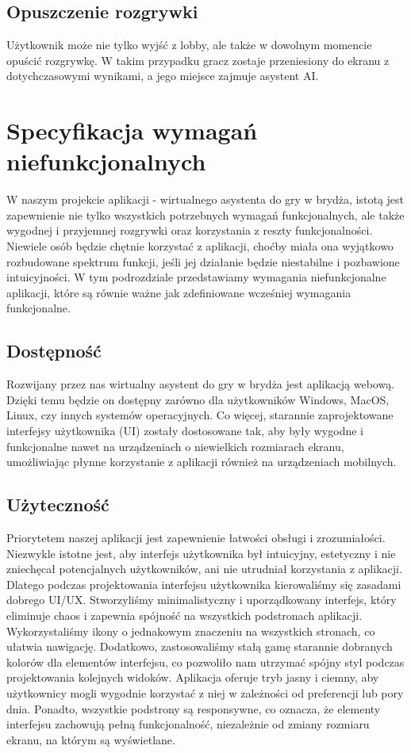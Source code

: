\subsection{Opuszczenie rozgrywki}
Użytkownik może nie tylko wyjść z lobby, ale także w dowolnym momencie opuścić rozgrywkę. W takim przypadku gracz zostaje przeniesiony do ekranu z dotychczasowymi wynikami, a jego miejsce zajmuje asystent AI.

\section{Specyfikacja wymagań niefunkcjonalnych}
W naszym projekcie aplikacji - wirtualnego asystenta do gry w brydża, istotą jest zapewnienie nie tylko wszystkich potrzebnych wymagań funkcjonalnych, ale także wygodnej i przyjemnej rozgrywki oraz korzystania z reszty funkcjonalności. Niewiele osób będzie chętnie korzystać z aplikacji, choćby miała ona wyjątkowo rozbudowane spektrum funkcji, jeśli jej działanie będzie niestabilne i pozbawione intuicyjności. W tym podrozdziale przedstawiamy wymagania niefunkcjonalne aplikacji, które są równie ważne jak zdefiniowane wcześniej wymagania funkcjonalne.
\subsection{Dostępność}
Rozwijany przez nas wirtualny asystent do gry w brydża jest aplikacją webową. Dzięki temu będzie on dostępny zarówno dla użytkowników Windows, MacOS, Linux, czy innych systemów operacyjnych. Co więcej, starannie zaprojektowane interfejsy użytkownika (UI) zostały dostosowane tak, aby były wygodne i funkcjonalne nawet na urządzeniach o niewielkich rozmiarach ekranu, umożliwiając płynne korzystanie z aplikacji również na urządzeniach mobilnych.
\subsection{Użyteczność}
Priorytetem naszej aplikacji jest zapewnienie łatwości obsługi i zrozumiałości. Niezwykle istotne jest, aby interfejs użytkownika był intuicyjny, estetyczny i nie zniechęcał potencjalnych użytkowników, ani nie utrudniał korzystania z aplikacji. Dlatego podczas projektowania interfejsu użytkownika kierowaliśmy się zasadami dobrego UI/UX. Stworzyliśmy minimalistyczny i uporządkowany interfejs, który eliminuje chaos i zapewnia spójność na wszystkich podstronach aplikacji. Wykorzystaliśmy ikony o jednakowym znaczeniu na wszystkich stronach, co ułatwia nawigację. Dodatkowo, zastosowaliśmy stałą gamę starannie dobranych kolorów dla elementów interfejsu, co pozwoliło nam utrzymać spójny styl podczas projektowania kolejnych widoków. Aplikacja oferuje tryb jasny i ciemny, aby użytkownicy mogli wygodnie korzystać z niej w zależności od preferencji lub pory dnia. Ponadto, wszystkie podstrony są responsywne, co oznacza, że elementy interfejsu zachowują pełną funkcjonalność, niezależnie od zmiany rozmiaru ekranu, na którym są wyświetlane.
